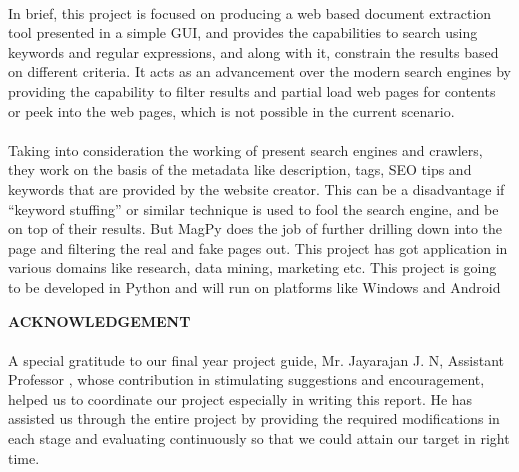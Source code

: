 \documentclass[a4paper]{report}
\begin{document}
\paragraph{}
\large\textnormal{In brief, this project is focused on producing a web based document extraction tool presented in a simple GUI, and provides the capabilities to search using keywords and regular expressions, and along with it, constrain the results based on different criteria. It acts as an advancement over the modern search engines by providing the capability to filter results and partial load web pages for contents or peek into the web pages, which is not possible in the current scenario.}
\paragraph{}
\large\textnormal{Taking into consideration the working of present search engines and crawlers, they work on the basis of the metadata like description, tags, SEO tips and keywords that are provided by the website creator. This can be a disadvantage if “keyword stuffing” or similar technique is used to fool the search engine, and be on top of their results. But MagPy does the job of further drilling down into the page and filtering the real and fake pages out. This project has got application in various domains like research, data mining, marketing etc. This project is going to be developed in Python and will run on platforms like Windows and Android}

\newpage
\begin{center}
\fontsize{17.28pt}{19.2pt}
\textbf{ACKNOWLEDGEMENT}\\[.5cm]
\end{center}
\setcounter{page}{3}
\paragraph{}
\linespread{1.3}
\large\textnormal{A special gratitude to our final year project guide, Mr. Jayarajan J. N, Assistant Professor , whose contribution in stimulating suggestions and encouragement, helped us to coordinate our project especially in writing this report. He has assisted us through the entire project by providing the required modifications in each stage and evaluating continuously so that we could attain our target in right time.}
\end{document}
